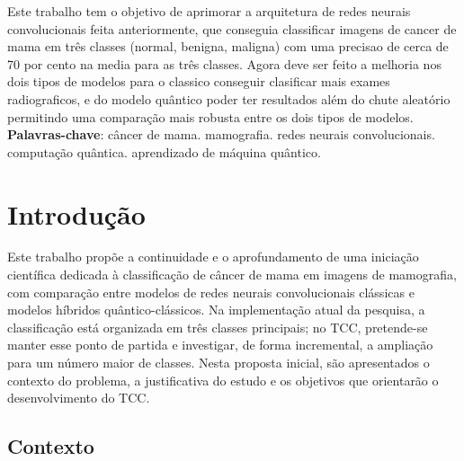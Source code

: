 \documentclass[
    12pt,
    openright,
    oneside,
    a4paper,
    english,
    brazil
]{abntex2}
\begin{document}
\frenchspacing

\pretextual
\imprimircapa
\imprimirfolhaderosto

\begin{resumo}

Este trabalho tem o objetivo de aprimorar a arquitetura de redes neurais convolucionais feita anteriormente, que conseguia classificar imagens de cancer de mama em três classes (normal, benigna, maligna) com uma precisao de cerca de 70 por cento na media para as três classes. Agora deve ser feito a melhoria nos dois tipos de modelos para o classico conseguir clasificar mais exames radiograficos, e do modelo quântico poder ter resultados além do chute aleatório permitindo uma comparação mais robusta entre os dois tipos de modelos. 
\vspace{\onelineskip}
\noindent
\textbf{Palavras-chave}: câncer de mama. mamografia. redes neurais convolucionais. computação quântica. aprendizado de máquina quântico.
\end{resumo}

\tableofcontents*
\cleardoublepage

\textual

\chapter{Introdução}
\label{cap:introducao}

Este trabalho propõe a continuidade e o aprofundamento de uma iniciação científica dedicada à classificação de câncer de mama em imagens de mamografia, com comparação entre modelos de redes neurais convolucionais clássicas e modelos híbridos quântico-clássicos. Na implementação atual da pesquisa, a classificação está organizada em três classes principais; no TCC, pretende-se manter esse ponto de partida e investigar, de forma incremental, a ampliação para um número maior de classes. Nesta proposta inicial, são apresentados o contexto do problema, a justificativa do estudo e os objetivos que orientarão o desenvolvimento do TCC.

\section{Contexto}
\label{sec:contexto}
\end{document}
